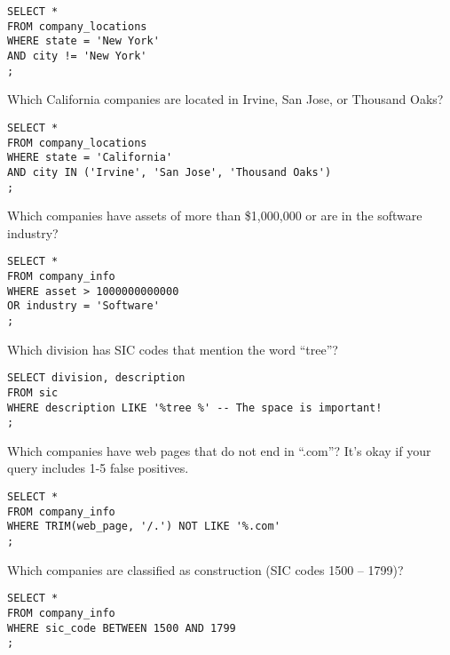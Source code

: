 \documentclass[10pt]{exam}
\begin{document}
\begin{questions}
\begin{solution}
\begin{lstlisting}
SELECT *
FROM company_locations
WHERE state = 'New York'
AND city != 'New York'
;
\end{lstlisting}
\end{solution}


\question Which California companies are located in Irvine, San Jose, or
Thousand Oaks?

\begin{solution}
\begin{lstlisting}
SELECT *
FROM company_locations
WHERE state = 'California'
AND city IN ('Irvine', 'San Jose', 'Thousand Oaks')
;
\end{lstlisting}
\end{solution}


\question Which companies have assets of more than \$1,000,000 or are in the
software industry?

\begin{solution}
\begin{lstlisting}
SELECT *
FROM company_info
WHERE asset > 1000000000000
OR industry = 'Software'
;
\end{lstlisting}
\end{solution}


\question Which division has SIC codes that mention the word ``tree''?

\begin{solution}
\begin{lstlisting}
SELECT division, description
FROM sic
WHERE description LIKE '%tree %' -- The space is important!
;
\end{lstlisting}
\end{solution}


\question Which companies have web pages that do not end in ``.com''? It's okay
if your query includes 1-5 false positives.

\begin{solution}
\begin{lstlisting}
SELECT *
FROM company_info
WHERE TRIM(web_page, '/.') NOT LIKE '%.com'
;
\end{lstlisting}
\end{solution}


\question Which companies are classified as construction (SIC codes 1500 --
1799)?

\begin{solution}
\begin{lstlisting}
SELECT *
FROM company_info
WHERE sic_code BETWEEN 1500 AND 1799
;
\end{lstlisting}
\end{solution}



\end{questions}
\end{document}
